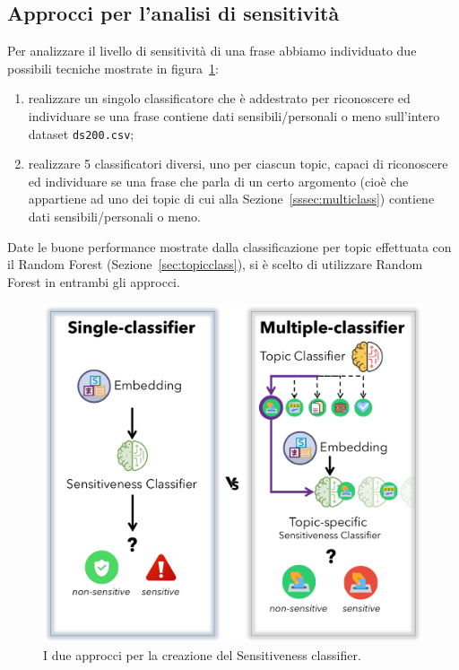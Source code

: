 \subsection{Approcci per l'analisi di sensitività}
\label{ssec:approcci}
Per analizzare il livello di sensitività di una frase abbiamo individuato due possibili tecniche mostrate in figura~\ref{fig:approccisens}:
\begin{enumerate}
    \item realizzare un singolo classificatore che è addestrato per riconoscere ed individuare se una frase contiene dati sensibili/personali o meno sull'intero dataset {\tt ds200.csv};
    \item realizzare 5 classificatori diversi, uno per ciascun topic, capaci di riconoscere ed individuare se una frase che parla di un certo argomento (cioè che appartiene ad uno dei topic di cui alla Sezione~\ref{sssec:multiclass}) contiene dati sensibili/personali o meno.
\end{enumerate}
Date le buone performance mostrate dalla classificazione per topic effettuata con il Random Forest (Sezione~\ref{sec:topicclass}), si è scelto di utilizzare Random Forest in entrambi gli approcci.

\begin{figure}[h]
    \centering
    \includegraphics[width=15cm]{Figure/grafici/vs_cropped.pdf}
    \caption{I due approcci per la creazione del Sensitiveness classifier.}
    \label{fig:approccisens}
\end{figure}
\FloatBarrier



